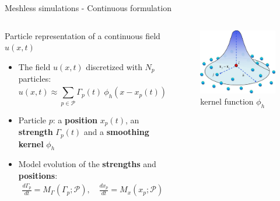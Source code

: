 \documentclass[aspectratio=169]{beamer} %
\begin{document}
\begin{frame}{Meshless simulations - Continuous formulation}
    \begin{columns}[t]
        \begin{column}{0.7\textwidth}
            \begin{Definition}
                Particle representation of a continuous field $u(x,t)$\\
            \end{Definition}
            \begin{itemize}
                \item The field $u(x, t)$ discretized with $N_p$ particles:
                      \begin{equation*}
                          u(x, t) \approx \sum_{p \in \mathcal P} \Gamma_p(t)~\phi_h(x - x_p(t)), \quad \mathcal P = \left\{x_p(t), \Gamma_p(t)\right\}_{p=1}^{N_p}
                      \end{equation*}
                \item Particle $p$: a \textbf{position} $x_p(t)$, an \textbf{strength} $\Gamma_p(t)$ and a \textbf{smoothing kernel} $\phi_h$

                \item Model evolution of the \textbf{strengths} and \textbf{positions}:
                      \begin{eqnarray*}
                          \frac{d\Gamma_p}{dt} = M_\Gamma(\Gamma_p; \mathcal P), \quad \frac{d x_p}{d t} = M_x(x_p; \mathcal P)
                      \end{eqnarray*}
            \end{itemize}
        \end{column}
        \begin{column}{0.3\textwidth}
            \begin{figure}
                \includegraphics[width=\textwidth]{../../conference/images/kernel.png}
                \caption*{ kernel function $\phi_h$}
            \end{figure}
        \end{column}
    \end{columns}
\end{frame}
\end{document}
